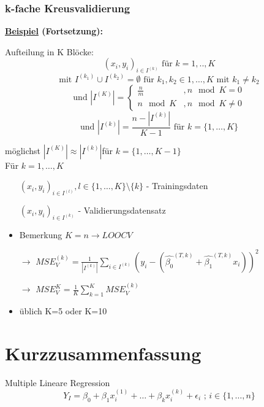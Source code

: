 \documentclass[10pt]{report}
\theoremstyle{definition}
\begin{document}
\subsubsection{k-fache Kreusvalidierung}
\textbf{\underline{Beispiel} (Fortsetzung):}

Aufteilung in K Blöcke:
\[(x_i, y_i)_{i \in I^{(k)}} \text{ für }  k = 1, .., K \] 
\[\text{mit } I^{(k_1)} \cup I^{(k_2)} = \emptyset \text{ für } k_1, k_2 \in {1, \ldots ,K} \text{ mit } k_1 \neq k_2 \]
\[ \text{und } |I^{(K)}| = \begin{cases}
\frac{n}{m} &, n \mod K= 0\\
n \mod K &, n \mod K \neq 0
\end{cases}
\]
\[\text{und } |I^{(k)}| = \frac{n - |I^{(k)}|}{K-1} \text{ für } k = \{1, \ldots ,K\} \]

möglichst \(|I^{(K)}| \approx |I^{(k)}|\)für \(k = \{1, \ldots ,K-1\}\)\\


Für \(k = 1, \ldots, K\) 
\begin{itemize}
	\item[] \((x_i, y_i)_{ i \in I^{(l)}}, l \in \{1, \ldots, K\}\setminus \{k\}\) - Trainingsdaten
	\item[] \((x_i, y_i)_{ i \in I^{(k)}} \) - Validierungsdatensatz
	\item Bemerkung \(K=n \rightarrow LOOCV\) 	
	\item[\(\rightarrow\)]\(MSE_V^{(k)} = \frac{1}{|I^{(k)}|} \sum_{i \in I^{(k)}} ( y_i -( \hat{\beta_0}^{(T,k)} + \hat{\beta_1}^{(T,k)}  x_i))^2\) 
	\item [\(\rightarrow\)]
	\(MSE_V^K = \frac{1}{K} \sum_{k=1}^{K} MSE_V^{(k)}\) 
	\item üblich K=5 oder K=10
\end{itemize}

\section{Kurzzusammenfassung}
Multiple Lineare Regression
\[Y_I = \beta_0 + \beta_1 x_i^{(1)} + \ldots + \beta_k x_i^{(k)} + \epsilon_i \text{ ; } i \in \{1, \ldots,n\}\]
\end{document}
